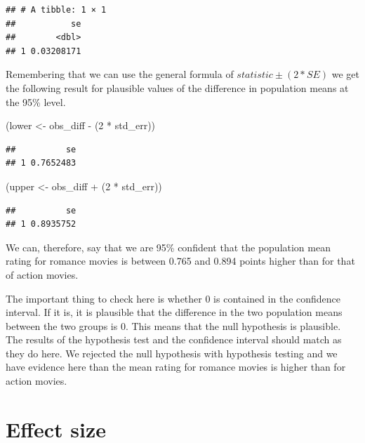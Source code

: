 \documentclass[]{tufte-book}
\newenvironment{Shaded}{\begin{snugshade}}{\end{snugshade}}
\newcommand{\DecValTok}[1]{\textcolor[rgb]{0.00,0.00,0.81}{{#1}}}
\newcommand{\StringTok}[1]{\textcolor[rgb]{0.31,0.60,0.02}{{#1}}}
\newcommand{\NormalTok}[1]{{#1}}
\begin{document}
\begin{verbatim}
## # A tibble: 1 × 1
##           se
##        <dbl>
## 1 0.03208171
\end{verbatim}

Remembering that we can use the general formula of
\(statistic \pm (2 * SE)\) we get the following result for plausible
values of the difference in population means at the 95\% level.

\begin{Shaded}
\begin{Highlighting}[]
\NormalTok{(lower <-}\StringTok{ }\NormalTok{obs_diff -}\StringTok{ }\NormalTok{(}\DecValTok{2} \NormalTok{*}\StringTok{ }\NormalTok{std_err))}
\end{Highlighting}
\end{Shaded}

\begin{verbatim}
##          se
## 1 0.7652483
\end{verbatim}

\begin{Shaded}
\begin{Highlighting}[]
\NormalTok{(upper <-}\StringTok{ }\NormalTok{obs_diff +}\StringTok{ }\NormalTok{(}\DecValTok{2} \NormalTok{*}\StringTok{ }\NormalTok{std_err))}
\end{Highlighting}
\end{Shaded}

\begin{verbatim}
##          se
## 1 0.8935752
\end{verbatim}

We can, therefore, say that we are 95\% confident that the population
mean rating for romance movies is between 0.765 and 0.894 points higher
than for that of action movies.

The important thing to check here is whether 0 is contained in the
confidence interval. If it is, it is plausible that the difference in
the two population means between the two groups is 0. This means that
the null hypothesis is plausible. The results of the hypothesis test and
the confidence interval should match as they do here. We rejected the
null hypothesis with hypothesis testing and we have evidence here than
the mean rating for romance movies is higher than for action movies.

\section{Effect size}\label{effect-size}
\end{document}

